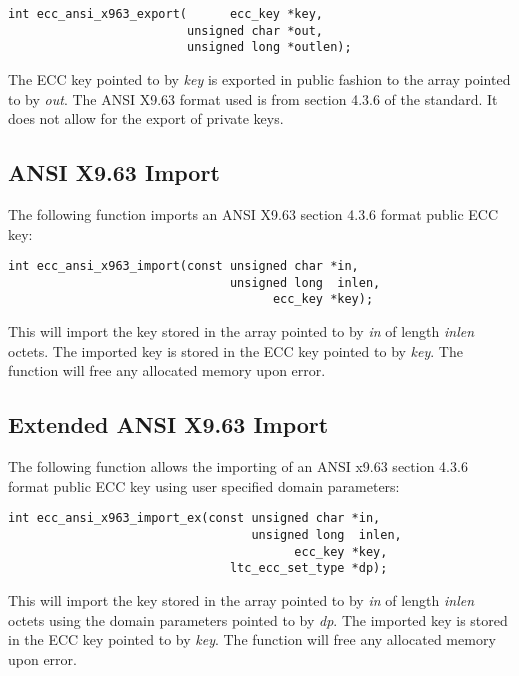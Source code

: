 \documentclass[synpaper]{book}
\begin{document}
\begin{verbatim}
int ecc_ansi_x963_export(      ecc_key *key,
                         unsigned char *out,
                         unsigned long *outlen);
\end{verbatim}
The ECC key pointed to by \textit{key} is exported in public fashion to the array pointed to by \textit{out}.  The ANSI X9.63 format used is from
section 4.3.6 of the standard.  It does not allow for the export of private keys.

\subsection{ANSI X9.63 Import}
The following function imports an ANSI X9.63 section 4.3.6 format public ECC key:

\begin{verbatim}
int ecc_ansi_x963_import(const unsigned char *in,
                               unsigned long  inlen,
                                     ecc_key *key);
\end{verbatim}
This will import the key stored in the array pointed to by \textit{in} of length \textit{inlen} octets.  The imported key is stored in the ECC key pointed to by
\textit{key}.  The function will free any allocated memory upon error.

\subsection{Extended ANSI X9.63 Import}
The following function allows the importing of an ANSI x9.63 section 4.3.6 format public ECC key using user specified domain parameters:

\begin{verbatim}
int ecc_ansi_x963_import_ex(const unsigned char *in,
                                  unsigned long  inlen,
                                        ecc_key *key,
                               ltc_ecc_set_type *dp);
\end{verbatim}
This will import the key stored in the array pointed to by \textit{in} of length \textit{inlen} octets using the domain parameters pointed to by \textit{dp}.
The imported key is stored in the ECC key pointed to by \textit{key}.  The function will free any allocated memory upon error.
\end{document}
